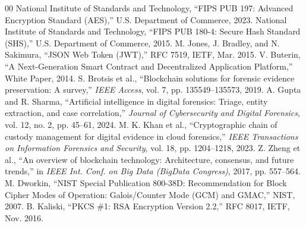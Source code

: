 \documentclass[conference]{IEEEtran}
\begin{document}
\begin{thebibliography}{00}
 National Institute of Standards and Technology, ``FIPS PUB 197: Advanced Encryption Standard (AES),'' U.S. Department of Commerce, 2023.
 National Institute of Standards and Technology, ``FIPS PUB 180-4: Secure Hash Standard (SHS),'' U.S. Department of Commerce, 2015.
 M. Jones, J. Bradley, and N. Sakimura, ``JSON Web Token (JWT),'' RFC 7519, IETF, Mar. 2015.
 V. Buterin, ``A Next-Generation Smart Contract and Decentralized Application Platform,'' White Paper, 2014.
 S. Brotsis et al., ``Blockchain solutions for forensic evidence preservation: A survey,'' \textit{IEEE Access}, vol. 7, pp. 135549--135573, 2019.
 A. Gupta and R. Sharma, ``Artificial intelligence in digital forensics: Triage, entity extraction, and case correlation,'' \textit{Journal of Cybersecurity and Digital Forensics}, vol. 12, no. 2, pp. 45--61, 2024.
 M. K. Khan et al., ``Cryptographic chain of custody management for digital evidence in cloud forensics,'' \textit{IEEE Transactions on Information Forensics and Security}, vol. 18, pp. 1204--1218, 2023.
 Z. Zheng et al., ``An overview of blockchain technology: Architecture, consensus, and future trends,'' in \textit{IEEE Int. Conf. on Big Data (BigData Congress)}, 2017, pp. 557--564.
 M. Dworkin, ``NIST Special Publication 800-38D: Recommendation for Block Cipher Modes of Operation: Galois/Counter Mode (GCM) and GMAC,'' NIST, 2007.
 B. Kaliski, ``PKCS \#1: RSA Encryption Version 2.2,'' RFC 8017, IETF, Nov. 2016.
\end{thebibliography}
\end{document}
